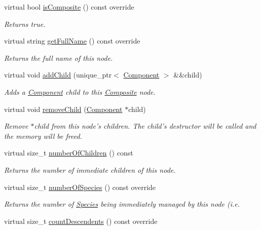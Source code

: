 \begin{DoxyCompactItemize}
virtual bool \hyperlink{classComposite_ae2c806010c5c1d2d166ce01f2710c271}{is\+Composite} () const override
\begin{DoxyCompactList}\small\item\em Returns true. \end{DoxyCompactList}\item 
virtual string \hyperlink{classComposite_a0219bb2449696a3ab84ff24e4462e2c2}{get\+Full\+Name} () const override
\begin{DoxyCompactList}\small\item\em Returns the full name of this node. \end{DoxyCompactList}\item 
virtual void \hyperlink{classComposite_aa3ebdb54e65379954e5f28cd84f00be0}{add\+Child} (unique\+\_\+ptr$<$ \hyperlink{classComponent}{Component} $>$ \&\&child)
\begin{DoxyCompactList}\small\item\em Adds a \hyperlink{classComponent}{Component} child to this \hyperlink{classComposite}{Composite} node. \end{DoxyCompactList}\item 
virtual void \hyperlink{classComposite_a1e62d11f4c16844277b215a2069c14be}{remove\+Child} (\hyperlink{classComponent}{Component} $\ast$child)
\begin{DoxyCompactList}\small\item\em Remove $\ast$child from this node's children. The child's destructor will be called and the memory will be freed. \end{DoxyCompactList}\item 
virtual size\+\_\+t \hyperlink{classComposite_ab00f34ad7c8f7cd90ea9392bd54fd62a}{number\+Of\+Children} () const 
\begin{DoxyCompactList}\small\item\em Returns the number of immediate children of this node. \end{DoxyCompactList}\item 
virtual size\+\_\+t \hyperlink{classComposite_af36fb9ed49f7fc262c68b41f2b9a56f6}{number\+Of\+Species} () const override
\begin{DoxyCompactList}\small\item\em Returns the number of \hyperlink{classSpecies}{Species} being immediately managed by this node (i.\+e. \end{DoxyCompactList}\item 
virtual size\+\_\+t \hyperlink{classComposite_aad7cea9220c003254233ec9dc6bcb24e}{count\+Descendents} () const override

\end{DoxyCompactItemize}
